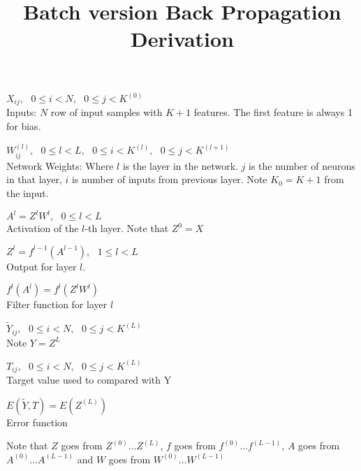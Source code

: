 \documentclass[14pt,letter,oneside]{article}
\begin{document}
	\title{Batch version Back Propagation Derivation}
	\begin{list}{-}{Variables}
		\item{$X_{ij}, \hspace{8pt} 0\leq i < N, \hspace{8pt} 0\leq j < K^{(0)}$} \\ 
		Inputs:  $N$ row of input samples with $K + 1$ features. The first feature is always 1 for bias.
		
		\item{ $W^{(l)}_{ij}, \hspace{8pt} 0\leq l < L, \hspace{8pt} 0 \leq i < K^{(l)}, \hspace{8pt} 0 \leq j < K^{(l+1)} $} \\
		Network Weights: Where $l$ is the layer in the network. $j$ is the number of neurons in that layer, $i$ is number of inputs from previous layer. Note $K_0 = K+1$ from the input.
		
		\item{ $A^l= Z^l W^l, \hspace{8pt} 0 \leq l < L$ } \\
		Activation of the $l$-th layer. Note that $Z^0 = X$
		
		\item { $Z^l = f^{l-1}(A^{l-1}), \hspace{8pt} 1 \leq l < L$} \\
		Output for layer $l$. 
	
		\item { $f^l(A^l) = f^l( Z^l W^l ) $} \\
		Filter function for layer $l$
		
		\item { $\tilde{Y}_{ij},  \hspace{8pt} 0\leq i < N, \hspace{8pt} 0\leq j < K^{(L)} $} \\
		Note $Y = Z^L$
		
		\item { $T_{ij}, \hspace{8pt} 0\leq i < N, \hspace{8pt} 0\leq j < K^{(L)} $ } \\
		Target value used to compared with Y
		
		\item { $E(\tilde{Y}, T) = E(Z^{(L)})$ } 
		\\ Error function 
 
	\end{list}
	 Note that $Z$ goes from $Z^{(0)}\ldots Z^{(L)}$, $f$ goes from $f^{(0)} \ldots f^{(L-1)}$, $A$ goes from $A^{(0)} \ldots A^{(L-1)}$ and $W$ goes from $W^{(0)} \ldots W^{(L-1)}$ \\\
	 
\end{document}
